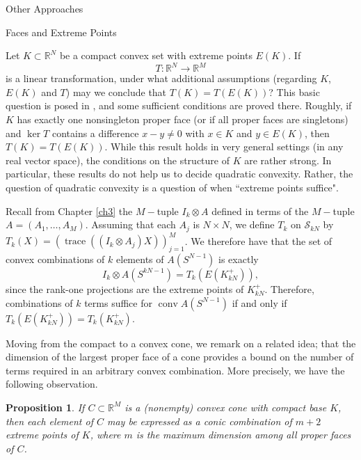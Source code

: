 \documentclass[12pt,oneside,final]{ucthesisucsbmath2010}
\newcommand{\R}{\mathbb{R}}
\newcommand{\s}{\mathcal{S}}
\DeclareMathOperator{\trace}{trace}
\DeclareMathOperator{\kernel}{ker}
\DeclareMathOperator{\conv}{conv}
\newtheorem{prop}[thm]{Proposition}
\theoremstyle{definition}
\begin{document}
\begin{chapter}{Other Approaches}
\begin{section}{Faces and Extreme Points}

Let $K\subset \R^N$ be a compact convex set with extreme points $E(K)$. If \[T:\R^N\to \R^M\] is a linear transformation, under what additional assumptions (regarding $K$, $E(K)$ and $T$) may we conclude that $T(K)=T(E(K))$? This basic question is posed in \cite{Baker}, and some sufficient conditions are proved there. Roughly, if $K$ has exactly one nonsingleton proper face (or if all proper faces are singletons) and $\kernel T$ contains a difference $x-y\neq 0$ with $x \in K$ and $y \in E(K)$, then $T(K)=T(E(K))$. While this result holds in very general settings (in any real vector space), the conditions on the structure of $K$ are rather strong. In particular, these results do not help us to decide quadratic convexity. Rather, the question of quadratic convexity is a question of when ``extreme points suffice".

Recall from Chapter \ref{ch3} the $M-$tuple $I_k \otimes A$ defined in terms of the $M-$tuple $A=(A_1,\ldots,A_M)$. Assuming that each $A_j$ is $N\times N$, we define $T_k$ on $\s_{kN}$ by $T_k(X) = (\trace ((I_k\otimes A_j) X))_{j=1}^M$. We therefore have that the set of convex combinations of $k$ elements of $A(S^{N-1})$ is exactly \[I_k \otimes A(S^{kN-1})=T_k(E(K_{kN}^+)),\]since the rank-one projections are the extreme points of $ K_{kN}^+$. Therefore, combinations of $k$ terms suffice for $\conv A(S^{N-1})$ if and only if $T_k(E(K_{kN}^+))=T_k(K_{kN}^+)$.

Moving from the compact to a convex cone, we remark on a related idea; that the dimension of the largest proper face of a cone provides a bound on the number of terms required in an arbitrary convex combination. More precisely, we have the following observation.

\begin{prop}If $C\subset \R^M$ is a (nonempty) convex cone with compact base $K$, then each element of $C$ may be expressed as a conic combination of $m+2$ extreme points of $K$, where $m$ is the maximum dimension among all proper faces of $C$.
\end{prop}


\end{section}
\end{chapter}
\end{document}
